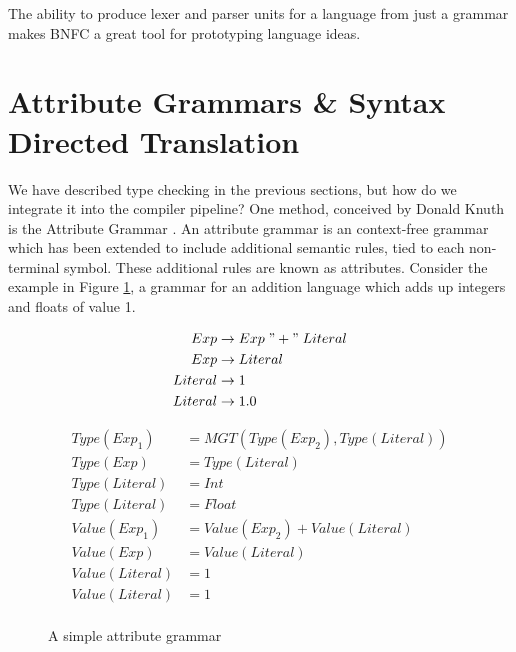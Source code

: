 \documentclass{UoYCSproject}
\begin{document}
The ability to produce lexer and parser units for a language from just a grammar
makes BNFC a great tool for prototyping language ideas.

\section{Attribute Grammars \& Syntax Directed Translation}
We have described type checking in the previous sections, but how do we
integrate it into the compiler pipeline? One method, conceived by Donald Knuth
is the Attribute Grammar \cite{KnuthGrammars}. An attribute grammar is an
context-free grammar which has been extended to include additional semantic
rules, tied to each non-terminal symbol. These additional rules are known as
attributes. Consider the example in Figure \ref{fig:AttributeGrammar}, a
grammar for an addition language which adds up integers and floats of value 1.

\begin{figure}
    \begin{minipage}[b]{.5\textwidth}
        \begin{align*}
            Exp &\rightarrow Exp \; "+" \; Literal \\
            Exp &\rightarrow Literal \\
            Literal &\rightarrow 1 \\
            Literal &\rightarrow 1.0
        \end{align*}
        \label{fig:ProductionRules}
    \end{minipage}
    \begin{minipage}[b]{.5\textwidth}
        \begin{align*}
            Type(Exp_1) &= MGT(Type(Exp_2), Type(Literal)) \\
            Type(Exp) &= Type(Literal) \\
            Type(Literal) &= Int \\
            Type(Literal) &= Float \\
            Value(Exp_1) &= Value(Exp_2) + Value(Literal) \\
            Value(Exp) &= Value(Literal) \\
            Value(Literal) &= 1 \\
            Value(Literal) &= 1 \\
        \end{align*}
        \label{fig:AttributeDefinitions}
    \end{minipage}
    \caption{A simple attribute grammar}
    \label{fig:AttributeGrammar}
\end{figure}
\end{document}
